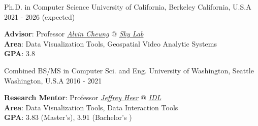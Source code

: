 
\begin{cventries}

\vspace{-4.0mm}
\begin{multicols}{2}

  \cventrycol
    {Ph.D. in Computer Science} %
    {University of California, Berkeley} %
    {California, U.S.A} %
    {2021 - 2026 (expected)} %
    {
      \vspace{-4.0mm}
      \begin{justify}
        \textbf{Advisor}: Professor \href{https://people.eecs.berkeley.edu/~akcheung/}{\textit{Alvin Cheung}} @ \href{https://sky.cs.berkeley.edu/}{\textit{Sky Lab}}\\
        \textbf{Area}: Data Visualization Tools, Geospatial Video Analytic Systems\\
        \textbf{GPA}: 3.8
      \end{justify}
    }
  \cventrycol
    {Combined BS/MS in Computer Sci. and Eng.} %
    {University of Washington, Seattle} %
    {Washington, U.S.A} %
    {2016 - 2021} %
    {
      \vspace{-4.0mm}
      \begin{justify}
        \textbf{Research Mentor}: Professor \href{https://homes.cs.washington.edu/~jheer/}{\textit{Jeffrey Heer}} @ \href{https://idl.cs.washington.edu/}{\textit{IDL}}\\
        \textbf{Area}: Data Visualization Tools, Data Interaction Tools\\
        \textbf{GPA}: 3.83 (Master's), 3.91 (Bachelor's )
      \end{justify}
    }
\end{multicols}
\vspace{-8mm}
\end{cventries}
